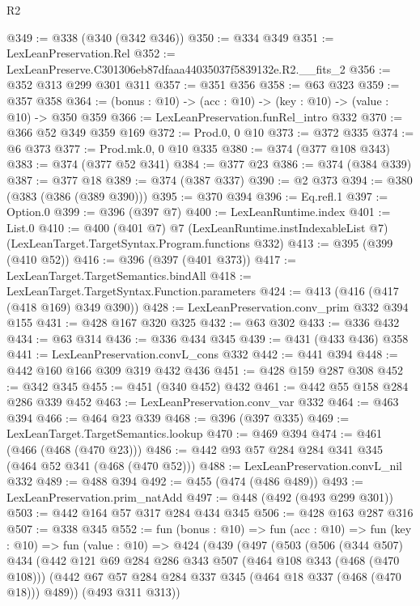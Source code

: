 \begin{lexlean}{R2}
\begin{coremodule}
@349 := @338 (@340 (@342 @346))
@350 := @334 @349
@351 := LexLeanPreservation.Rel
@352 := LexLeanPreserve.C301306eb87dfaaa44035037f5839132e.R2.__fits_2
@356 := @352 @313 @299 @301 @311
@357 := @351 @356
@358 := @63 @323
@359 := @357 @358
@364 := (bonus : @10) -> (acc : @10) -> (key : @10) -> (value : @10) -> @350 @359
@366 := LexLeanPreservation.funRel_intro @332
@370 := @366 @52 @349 @359 @169
@372 := Prod.{0, 0} @10
@373 := @372 @335
@374 := @6 @373
@377 := Prod.mk.{0, 0} @10 @335
@380 := @374 (@377 @108 @343)
@383 := @374 (@377 @52 @341)
@384 := @377 @23
@386 := @374 (@384 @339)
@387 := @377 @18
@389 := @374 (@387 @337)
@390 := @2 @373
@394 := @380 (@383 (@386 (@389 @390)))
@395 := @370 @394
@396 := Eq.refl.{1}
@397 := Option.{0}
@399 := @396 (@397 @7)
@400 := LexLeanRuntime.index
@401 := List.{0}
@410 := @400
    (@401 @7)
    @7
    (LexLeanRuntime.instIndexableList @7)
    (LexLeanTarget.TargetSyntax.Program.functions @332)
@413 := @395 (@399 (@410 @52))
@416 := @396 (@397 (@401 @373))
@417 := LexLeanTarget.TargetSemantics.bindAll
@418 := LexLeanTarget.TargetSyntax.Function.parameters
@424 := @413 (@416 (@417 (@418 @169) @349 @390))
@428 := LexLeanPreservation.conv_prim @332 @394 @155
@431 := @428 @167 @320 @325
@432 := @63 @302
@433 := @336 @432
@434 := @63 @314
@436 := @336 @434 @345
@439 := @431 (@433 @436) @358
@441 := LexLeanPreservation.convL_cons @332
@442 := @441 @394
@448 := @442 @160 @166 @309 @319 @432 @436
@451 := @428 @159 @287 @308
@452 := @342 @345
@455 := @451 (@340 @452) @432
@461 := @442 @55 @158 @284 @286 @339 @452
@463 := LexLeanPreservation.conv_var @332
@464 := @463 @394
@466 := @464 @23 @339
@468 := @396 (@397 @335)
@469 := LexLeanTarget.TargetSemantics.lookup
@470 := @469 @394
@474 := @461 (@466 (@468 (@470 @23)))
@486 := @442 @93 @57 @284 @284 @341 @345 (@464 @52 @341 (@468 (@470 @52)))
@488 := LexLeanPreservation.convL_nil @332
@489 := @488 @394
@492 := @455 (@474 (@486 @489))
@493 := LexLeanPreservation.prim_natAdd
@497 := @448 (@492 (@493 @299 @301))
@503 := @442 @164 @57 @317 @284 @434 @345
@506 := @428 @163 @287 @316
@507 := @338 @345
@552 := fun (bonus : @10) =>
  fun (acc : @10) =>
  fun (key : @10) =>
  fun (value : @10) =>
  @424
    (@439
      (@497
        (@503
          (@506
            (@344 @507)
            @434
            (@442
              @121
              @69
              @284
              @286
              @343
              @507
              (@464 @108 @343 (@468 (@470 @108)))
              (@442 @67 @57 @284 @284 @337 @345 (@464 @18 @337 (@468 (@470 @18))) @489))
            (@493 @311 @313))

\end{coremodule}
\end{lexlean}
